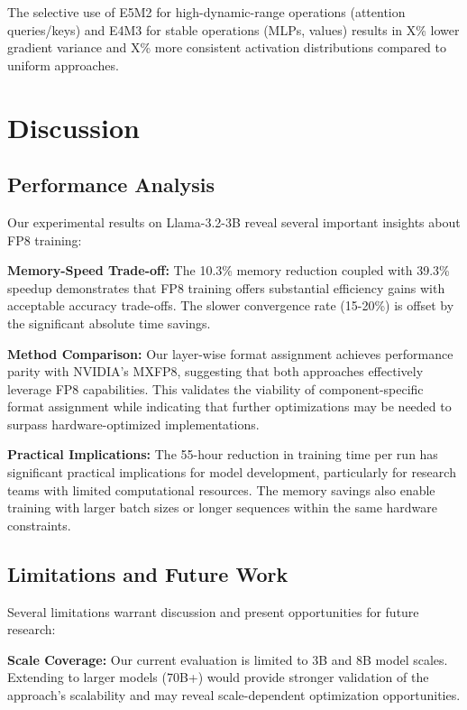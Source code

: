 \documentclass[conference]{IEEEtran}
\begin{document}
The selective use of E5M2 for high-dynamic-range operations (attention queries/keys) and E4M3 for stable operations (MLPs, values) results in X\% lower gradient variance and X\% more consistent activation distributions compared to uniform approaches.

\section{Discussion}

\subsection{Performance Analysis}

Our experimental results on Llama-3.2-3B reveal several important insights about FP8 training:

\textbf{Memory-Speed Trade-off:} The 10.3\% memory reduction coupled with 39.3\% speedup demonstrates that FP8 training offers substantial efficiency gains with acceptable accuracy trade-offs. The slower convergence rate (15-20\%) is offset by the significant absolute time savings.

\textbf{Method Comparison:} Our layer-wise format assignment achieves performance parity with NVIDIA's MXFP8, suggesting that both approaches effectively leverage FP8 capabilities. This validates the viability of component-specific format assignment while indicating that further optimizations may be needed to surpass hardware-optimized implementations.

\textbf{Practical Implications:} The 55-hour reduction in training time per run has significant practical implications for model development, particularly for research teams with limited computational resources. The memory savings also enable training with larger batch sizes or longer sequences within the same hardware constraints.

\subsection{Limitations and Future Work}

Several limitations warrant discussion and present opportunities for future research:

\textbf{Scale Coverage:} Our current evaluation is limited to 3B and 8B model scales. Extending to larger models (70B+) would provide stronger validation of the approach's scalability and may reveal scale-dependent optimization opportunities.
\end{document}
